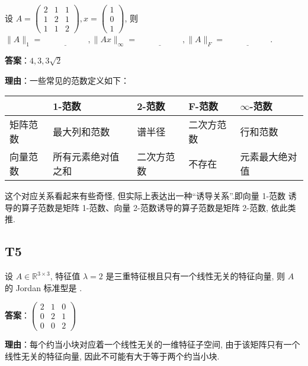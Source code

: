 \documentclass{article}
\begin{document}
\par 设 $A=\begin{pmatrix}
	2 & 1 & 1\\
	1 & 2 & 1\\
	1 & 1 & 2
\end{pmatrix}, x=\begin{pmatrix}
	1\\0\\1
\end{pmatrix}$, 则 $\|A\|_1=\underline{\phantom{empty\_space}}, \|Ax\|_{\infty}=\underline{\phantom{empty\_space}}, \|A\|_F=\underline{\phantom{empty\_space}}$.

\par \textbf{答案}：$4, 3, 3\sqrt 2$

\par \textbf{理由}：一些常见的范数定义如下：

\begin{tabularx}{\linewidth}{|X|X|X|X|X|} 
	\hline
	 & 1-范数 & 2-范数 & F-范数 & $\infty$-范数 \\ 
	\hline
	矩阵范数 & 最大列和范数 & 谱半径 & 二次方范数 & 行和范数 \\ 
	\hline
	向量范数 & 所有元素绝对值之和 & 二次方范数 & 不存在 & 元素最大绝对值 \\ 
	\hline
\end{tabularx}

\par 这个对应关系看起来有些奇怪, 但实际上表达出一种“诱导关系”.即向量 1-范数 诱导的算子范数是矩阵 1-范数、向量 2-范数诱导的算子范数是矩阵 2-范数, 依此类推.

\subsection{T5}

\par 设 $A\in \mathbb R^{3\times 3}$, 特征值 $\lambda=2$ 是三重特征根且只有一个线性无关的特征向量, 则 $A$ 的 Jordan 标准型是 \underline{\phantom{empty\_space}}.

\par\textbf{答案}：$\begin{pmatrix}
	2 & 1 & 0\\
	0 & 2 & 1\\
	0 & 0 & 2
\end{pmatrix}$

\par \textbf{理由}：每个约当小块对应着一个线性无关的一维特征子空间, 由于该矩阵只有一个线性无关的特征向量, 因此不可能有大于等于两个约当小块.
\end{document}
